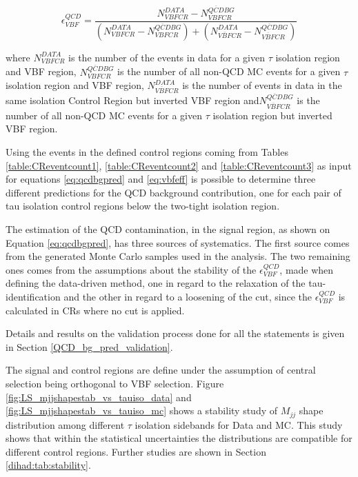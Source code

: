 \begin{equation}
\epsilon^{QCD}_{VBF} = \frac {N^{DATA}_{VBF CR} - N^{\overline{QCD} BG}_{VBFCR}}{\left( N^{DATA}_{VBFCR} - N^{\overline{QCD} BG}_{VBFCR} \right) + \left( N^{DATA}_{\overline{VBF}CR} - N^{\overline{QCD} BG}_{\overline{VBF}CR} \right) }
\label{eq:vbfeff}
\end{equation}

where $N^{DATA}_{VBF CR}$ is the number of the events in data for a given $ \tau $ isolation region and VBF region, $N^{\overline{QCD} BG}_{VBFCR}$ is the number of all non-QCD MC events for a given $ \tau $ isolation region and VBF region, $N^{DATA}_{\overline{VBF}CR}$ is the number of events in data in the same isolation Control Region but inverted VBF region and$N^{\overline{QCD} BG}_{\overline{VBF}CR}$ is the number of all non-QCD MC events for a given $ \tau $ isolation region but inverted VBF region.

Using the events in the defined control regions coming from Tables \ref{table:CReventcount1}, \ref{table:CReventcount2} and \ref{table:CReventcount3} as input for equations \ref{eq:qcdbgpred} and \ref{eq:vbfeff} is possible to determine three different predictions for the QCD background contribution, one for each pair of tau isolation control regions below the two-tight isolation region.

The estimation of the QCD contamination, in the signal region, as shown on Equation \ref{eq:qcdbgpred}, has three sources of systematics. The first source comes from the generated Monte Carlo samples used in the analysis. The two remaining ones comes from the assumptions about the stability of the $\epsilon^{QCD}_{VBF}$, made when defining the data-driven method, one in regard to the relaxation of the tau-identification and the other in regard to a loosening of the \met cut, since the $\epsilon^{QCD}_{VBF}$ is calculated in CRs where no \met cut is applied.

Details and results on the validation process done for all the statements is given in Section \ref{QCD_bg_pred_validation}.

The signal and control regions are define under the assumption of central selection being orthogonal to VBF selection. Figure \ref{fig:LS_mjjshapestab_vs_tauiso_data} and \ref{fig:LS_mjjshapestab_vs_tauiso_mc} shows a stability study of $M_{jj}$ shape distribution among different $\tau$ isolation sidebands for Data and MC. This study shows that within the statistical uncertainties the distributions are compatible for different control regions. Further studies are shown in Section \ref{dihad:tab:stability}.

